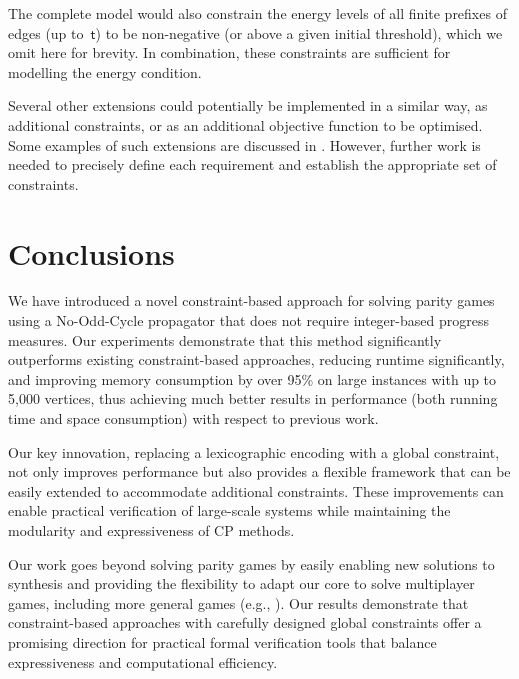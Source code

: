\documentclass[a4paper,UKenglish,cleveref, autoref, thm-restate, anonymous]{lipics-v2021}
\begin{document}
The complete model would also constrain the energy levels of all finite prefixes of edges (up to~$\mathsf{t}$) to be non-negative (or above a given initial threshold), which we omit here for brevity. In combination, these constraints are sufficient for modelling the energy condition.


Several other extensions could potentially be implemented in a similar way, as additional constraints, or as an additional objective function to be optimised. Some examples of such extensions are discussed in \cite{bozzelly:2020, Fijalkow:2014, Mogavero:2015, Weinert:2016}. However, further work is needed to precisely define each requirement and establish the appropriate set of constraints.%

\section{Conclusions}


We have introduced a novel constraint-based approach for solving parity games using a No-Odd-Cycle propagator that does not require integer-based progress measures. Our experiments demonstrate that this method significantly outperforms existing constraint-based approaches, reducing runtime significantly, and improving memory consumption by over 95\% on large instances with up to 5,000 vertices, thus achieving much better results in performance (both running time and space consumption) with respect to previous work. 

Our key innovation, replacing a lexicographic encoding with a global constraint, not only improves performance but also provides a flexible framework that can be easily extended to accommodate additional constraints.  These improvements can enable practical verification of large-scale systems while maintaining the modularity and expressiveness of CP methods.

Our work goes beyond solving parity games by easily enabling new solutions to synthesis and providing the flexibility to adapt our core to solve multiplayer games, including more general games (e.g.,  \wregulargames \cite{Chatterjee:2012}). Our results demonstrate that constraint-based approaches with carefully designed global constraints offer a promising direction for practical formal verification tools that balance expressiveness and computational efficiency.



\appendix
\end{document}
